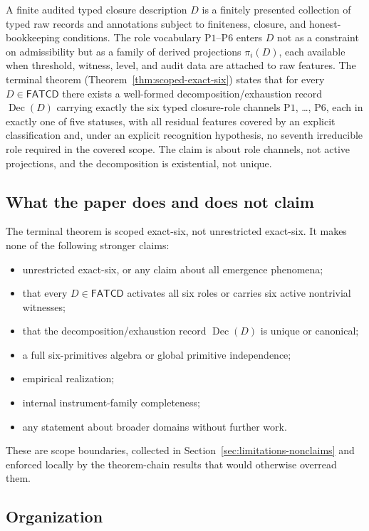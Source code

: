 \documentclass[11pt]{article}
\theoremstyle{definition}
\newcommand{\FATCD}{\ensuremath{\mathsf{FATCD}}}
\newcommand{\Dec}[1]{\ensuremath{\operatorname{Dec}\!\left(#1\right)}}
\newcommand{\Pone}{\ensuremath{\mathrm{P1}}}
\newcommand{\Psix}{\ensuremath{\mathrm{P6}}}
\begin{document}
A finite audited typed closure description \(D\) is a finitely
presented collection of typed raw records and annotations subject to
finiteness, closure, and honest-bookkeeping conditions. The role
vocabulary \Pone{}--\Psix{} enters \(D\) not as a constraint on
admissibility but as a family of derived projections \(\pi_i(D)\),
each available when threshold, witness, level, and audit data are
attached to raw features. The terminal theorem
(Theorem~\ref{thm:scoped-exact-six}) states that for every
\(D \in \FATCD{}\) there exists a well-formed
decomposition/exhaustion record \(\Dec{D}\) carrying exactly the six
typed closure-role channels \Pone{}, \ldots, \Psix{}, each in exactly
one of five statuses, with all residual features covered by an
explicit classification and, under an explicit recognition hypothesis, no
seventh irreducible role required in the covered scope. The claim is about role channels, not active
projections, and the decomposition is existential, not unique.

\subsection{What the paper does and does not claim}\label{subsec:intro-nonclaims}

The terminal theorem is scoped exact-six, not unrestricted exact-six.
It makes none of the following stronger claims:
\begin{itemize}[topsep=2pt,itemsep=1pt]
  \item unrestricted exact-six, or any claim about all emergence
    phenomena;
  \item that every \(D \in \FATCD{}\) activates all six roles or
    carries six active nontrivial witnesses;
  \item that the decomposition/exhaustion record \(\Dec{D}\) is unique
    or canonical;
  \item a full six-primitives algebra or global primitive
    independence;
  \item empirical realization;
  \item internal instrument-family completeness;
  \item any statement about broader domains without further work.
\end{itemize}
These are scope boundaries, collected in
Section~\ref{sec:limitations-nonclaims} and enforced locally by the
theorem-chain results that would otherwise overread them.

\subsection{Organization}\label{subsec:organization}
\end{document}
